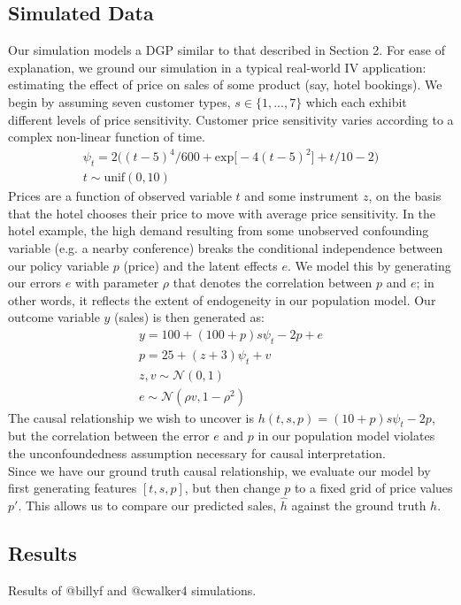 \documentclass[11pt, oneside, twocolumn]{article}   	%
\begin{document}
\subsection{Simulated Data}
Our simulation models a DGP similar to that described in Section 2. For ease of explanation, we ground our simulation in a typical real-world IV application: estimating the effect of price on sales of some product (say, hotel bookings). We begin by assuming seven customer types, $s \in \{1,...,7\}$ which each exhibit different levels of price sensitivity. Customer price sensitivity varies according to a complex non-linear function of time.
\begin{gather*}
\psi_t = 2\big((t-5)^4/600 + \textrm{exp}\big[-4(t-5)^2\big] + t/10 - 2 \big)\\
t \sim \textrm{unif}(0,10)
\end{gather*}
Prices are a function of observed variable $t$ and some instrument $z$, on the basis that the hotel chooses their price to move with average price sensitivity. In the hotel example, the high demand resulting from some unobserved confounding variable (e.g. a nearby conference) breaks the conditional independence between our policy variable $p$ (price) and the latent effects $e$. We model this by generating our errors $e$ with parameter $\rho$ that denotes the correlation between $p$ and $e$; in other words, it reflects the extent of endogeneity in our population model. Our outcome variable $y$ (sales) is then generated as:
\begin{gather*}
y = 100 + (100 + p)s\psi_t - 2p + e \\
p = 25 + (z + 3)\psi_t + v \\
z, v \sim \mathcal{N}(0,1) \\
e \sim \mathcal{N}(\rho v, 1 - \rho^2)
\end{gather*}
The causal relationship we wish to uncover is $h(t, s, p) = (10 + p)s\psi_t - 2p$, but the correlation between the error $e$ and $p$ in our population model violates the unconfoundedness assumption necessary for causal interpretation. \\

Since we have our ground truth causal relationship, we evaluate our model by first generating features $[t, s, p]$, but then change $p$ to a fixed grid of price values $p'$. This allows us to compare our predicted sales, $\hat{h}$ against the ground truth $h$. 

\subsection{Results} 
Results of @billyf and @cwalker4 simulations.
\end{document}

